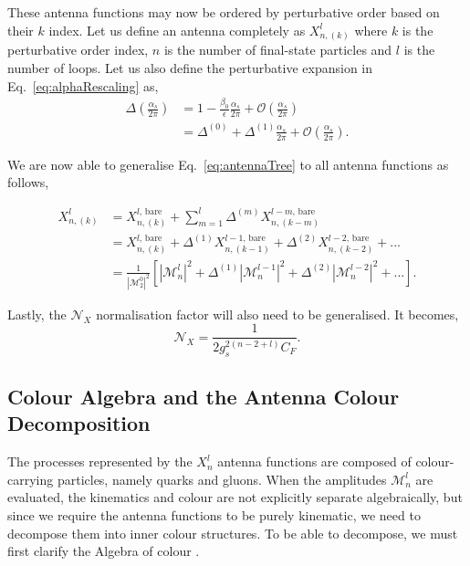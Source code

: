 These antenna functions may now be ordered by perturbative order based on their $k$ index. 
Let us define an antenna completely as $X_{n,(k)}^{l}$ where $k$ is the 
perturbative order index, $n$ is the number of final-state particles and $l$ is 
the number of loops. Let us also define the perturbative expansion in
Eq.~\eqref{eq:alphaRescaling} as,
\begin{equation}
    \begin{split}
        \Delta\left(\frac{\alpha_s}{2\pi}\right)&=1-\frac{\beta_0}{\epsilon}\frac{\alpha_s}{2\pi}+\mathcal O\left(\frac{\alpha_s}{2\pi}\right)\\
                                                &=\Delta^{(0)}+\Delta^{(1)}\frac{\alpha_s}{2\pi}+\mathcal O\left(\frac{\alpha_s}{2\pi}\right).
    \end{split}    
\end{equation}

We are now able to generalise Eq.~\eqref{eq:antennaTree} to all antenna functions as
follows,

\begin{equation}\label{eq:bornNorm}
    \begin{split}
        X_{n,(k)}^l&=X_{n,(k)}^{l\text{, bare}}+\sum_{m=1}^{l}\Delta^{(m)}X_{n,(k-m)}^{l-m\text{, bare}}\\
                   &=X_{n,(k)}^{l\text{, bare}}+\Delta^{(1)}X_{n,(k-1)}^{l-1\text{, bare}}+\Delta^{(2)}X_{n,(k-2)}^{l-2\text{, bare}}+...\\
                   &=\frac1{\left|\mathcal M_2^0\right|^2}\left[\left|\mathcal M_n^l\right|^2+\Delta^{(1)}\left|\mathcal M_n^{l-1}\right|^2+\Delta^{(2)}\left|\mathcal M_n^{l-2}\right|^2+...\right].
    \end{split}
\end{equation}

Lastly, the $\mathcal N_X$ normalisation factor will also need to be generalised. 
It becomes,
\begin{equation}
    \mathcal N_X = \frac{1}{2g_s^{2(n-2+l)}C_F}.
\end{equation}

\subsection{Colour Algebra and the Antenna Colour Decomposition}\label{subsec:colourAlg}

The processes represented by the $X_n^l$ antenna functions are composed of 
colour-carrying particles, namely quarks and gluons. When the amplitudes
$\mathcal M_n^l$ are evaluated, the kinematics and colour are not explicitly 
separate algebraically, but since we require the antenna functions to be purely 
kinematic, we need to decompose them into inner colour structures. To be able 
to decompose, we must first clarify the Algebra of colour
\cite{Gehrmann-DeRidder:2005btv,Kosower:1997zr}. 

